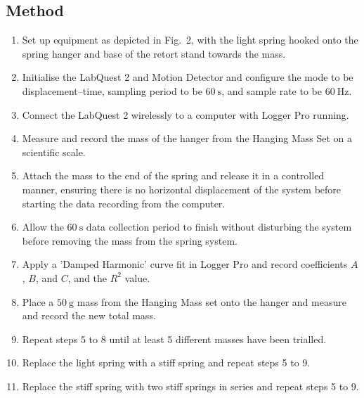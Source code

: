 \subsection{Method}
\begin{enumerate}
    \item Set up equipment as depicted in Fig.~2, with the light spring hooked onto the spring hanger and base of the retort stand towards the mass.
    \item Initialise the LabQuest 2 and Motion Detector and configure the mode to be displacement--time, sampling period to be $\SI{60}{\s}$, and sample rate to be $\SI{60}{\hertz}$.
    \item Connect the LabQuest 2 wirelessly to a computer with Logger Pro running.
    \item Measure and record the mass of the hanger from the Hanging Mass Set on a scientific scale.
    \item Attach the mass to the end of the spring and release it in a controlled manner, ensuring there is no horizontal displacement of the system before starting the data recording from the computer.
    \item Allow the $\SI{60}{\s}$ data collection period to finish without disturbing the system before removing the mass from the spring system.
    \item Apply a 'Damped Harmonic' curve fit in Logger Pro and record coefficients $A$, $B$, and $C$, and the $R^2$ value.
    \item Place a $\SI{50}{\gram}$ mass from the Hanging Mass set onto the hanger and measure and record the new total mass.
    \item Repeat steps 5 to 8 until at least 5 different masses have been trialled.
    \item Replace the light spring with a stiff spring and repeat steps 5 to 9.
    \item Replace the stiff spring with two stiff springs in series and repeat steps 5 to 9.
\end{enumerate}
